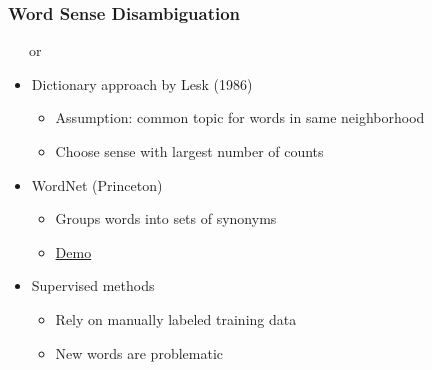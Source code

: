 \begin{frame}
    \frametitle{Word Sense Disambiguation}

\begin{center}
  $\,\!\quad$ or $\,\!\quad$   
\end{center}

\begin{itemize}
\item Dictionary approach by \textcolor{iseblue}{Lesk (1986)}
\begin{itemize}
\item Assumption: common topic for words in same neighborhood
\item Choose sense with largest number of counts
\end{itemize}
\end{itemize}

\begin{itemize}
\item WordNet (Princeton)
\begin{itemize}
\item Groups words into sets of synonyms
\item \textcolor{iseblue}{\href{http://wordnetweb.princeton.edu/perl/webwn?s=tank&sub=Search+WordNet&o2=&o0=1&o8=1&o1=1&o7=&o5=&o9=&o6=&o3=&o4=&h=}{Demo}}
\end{itemize}
\end{itemize}
\begin{itemize}
\item Supervised methods
\begin{itemize}
\item Rely on manually labeled training data
\item New words are problematic
\end{itemize}
\end{itemize}

\end{frame}


